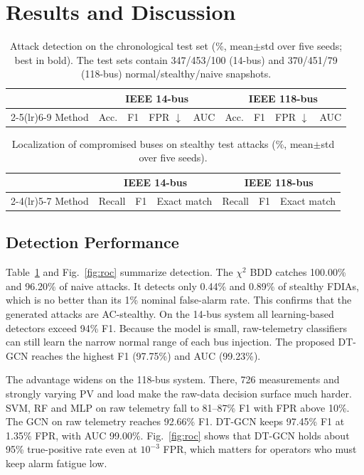 \section{Results and Discussion}
\begin{table}[t]
\centering
\caption{Attack detection on the chronological test set (\%, mean$\pm$std over five seeds; best in bold). The test sets contain 347/453/100 (14-bus) and 370/451/79 (118-bus) normal/stealthy/naive snapshots.}
\label{tab:det}
\footnotesize
\setlength{\tabcolsep}{3.2pt}
\begin{tabular}{l cccc cccc}
\toprule
& \multicolumn{4}{c}{IEEE 14-bus} & \multicolumn{4}{c}{IEEE 118-bus}\\
\cmidrule(lr){2-5}\cmidrule(lr){6-9}
Method & Acc. & F1 & FPR $\downarrow$ & AUC & Acc. & F1 & FPR $\downarrow$ & AUC\\
\midrule

\bottomrule
\end{tabular}
\end{table}

\begin{table}[t]
\centering
\caption{Localization of compromised buses on stealthy test attacks (\%, mean$\pm$std over five seeds).}
\label{tab:loc}
\footnotesize
\begin{tabular}{l ccc ccc}
\toprule
& \multicolumn{3}{c}{IEEE 14-bus} & \multicolumn{3}{c}{IEEE 118-bus}\\
\cmidrule(lr){2-4}\cmidrule(lr){5-7}
Method & Recall & F1 & Exact match & Recall & F1 & Exact match\\
\midrule

\bottomrule
\end{tabular}
\end{table}

\subsection{Detection Performance}
Table~\ref{tab:det} and Fig.~\ref{fig:roc} summarize detection. The $\chi^2$ BDD catches 100.00\% and 96.20\% of naive attacks. It detects only 0.44\% and 0.89\% of stealthy FDIAs, which is no better than its 1\% nominal false-alarm rate. This confirms that the generated attacks are AC-stealthy. On the 14-bus system all learning-based detectors exceed 94\% F1. Because the model is small, raw-telemetry classifiers can still learn the narrow normal range of each bus injection. The proposed DT-GCN reaches the highest F1 (97.75\%) and AUC (99.23\%).

The advantage widens on the 118-bus system. There, 726 measurements and strongly varying PV and load make the raw-data decision surface much harder. SVM, RF and MLP on raw telemetry fall to 81--87\% F1 with FPR above 10\%. The GCN on raw telemetry reaches 92.66\% F1. DT-GCN keeps 97.45\% F1 at 1.35\% FPR, with AUC 99.00\%. Fig.~\ref{fig:roc} shows that DT-GCN holds about 95\% true-positive rate even at $10^{-3}$ FPR, which matters for operators who must keep alarm fatigue low.

